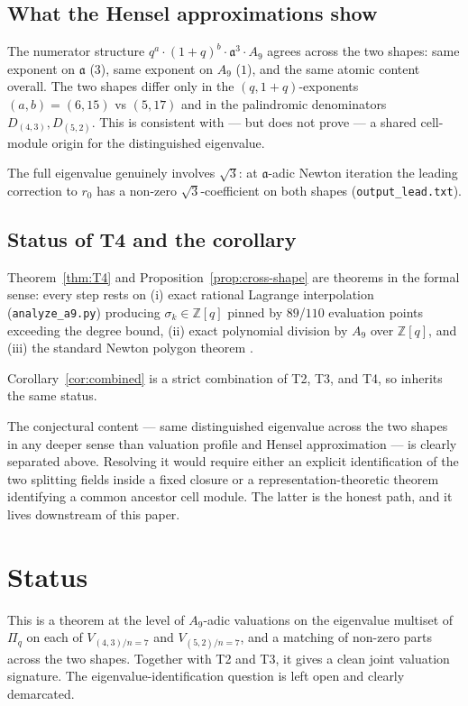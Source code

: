 \documentclass[11pt]{article}
\theoremstyle{plain}
\theoremstyle{definition}
\theoremstyle{remark}
\newcommand{\Z}{\mathbb{Z}}
\newcommand{\Pibs}{\Pi_q}
\newcommand{\atom}{\mathfrak{a}}
\begin{document}
\subsection{What the Hensel approximations show}

The numerator structure $q^a \cdot (1+q)^b \cdot \atom^3 \cdot A_9$ agrees
across the two shapes: same exponent on $\atom$ ($3$), same exponent on $A_9$
($1$), and the same atomic content overall.  The two shapes differ only in the
$(q, 1+q)$-exponents $(a, b) = (6, 15)$ vs $(5, 17)$ and in the palindromic
denominators $D_{(4,3)}, D_{(5,2)}$.  This is consistent with — but does not
prove — a shared cell-module origin for the distinguished eigenvalue.

The full eigenvalue genuinely involves $\sqrt 3$: at $\atom$-adic Newton
iteration the leading correction to $r_0$ has a non-zero $\sqrt 3$-coefficient
on both shapes (\texttt{output\_lead.txt}).

\subsection{Status of T4 and the corollary}

Theorem~\ref{thm:T4} and Proposition~\ref{prop:cross-shape} are theorems in the
formal sense: every step rests on (i) exact rational Lagrange interpolation
(\texttt{analyze\_a9.py}) producing $\sigma_k \in \Z[q]$ pinned by $89$/$110$
evaluation points exceeding the degree bound, (ii) exact polynomial division by
$A_9$ over $\Z[q]$, and (iii) the standard Newton polygon theorem
\cite[Ch.~II,~Cor.~6.5]{Neukirch}.

Corollary~\ref{cor:combined} is a strict combination of T2, T3, and T4, so
inherits the same status.

The conjectural content — same distinguished eigenvalue across the two shapes
in any deeper sense than valuation profile and Hensel approximation — is
clearly separated above.  Resolving it would require either an explicit
identification of the two splitting fields inside a fixed closure or a
representation-theoretic theorem identifying a common ancestor cell module.
The latter is the honest path, and it lives downstream of this paper.

\section{Status}

This is a theorem at the level of $A_9$-adic valuations on the eigenvalue
multiset of $\Pibs$ on each of $V_{(4,3)/n=7}$ and $V_{(5,2)/n=7}$, and a
matching of non-zero parts across the two shapes.  Together with T2 and T3, it
gives a clean joint valuation signature.  The eigenvalue-identification
question is left open and clearly demarcated.
\end{document}
